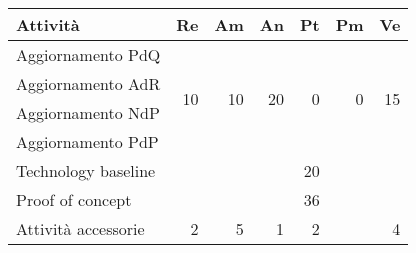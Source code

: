 \begin{table}[H]
	\centering
	\begin{tabular}{|l|r|r|r|r|r|r|}
		\hline
		\rowcolor{lighter-grayer}
		\textbf{Attività}                                                           & \multicolumn{1}{l|}{\textbf{Re}} & \multicolumn{1}{l|}{\textbf{Am}} & \multicolumn{1}{l|}{\textbf{An}} & \multicolumn{1}{l|}{\textbf{Pt}} & \multicolumn{1}{l|}{\textbf{Pm}} & \multicolumn{1}{l|}{\textbf{Ve}} \\ \hline
		Aggiornamento PdQ                                                           & \multirow{4}{*}{10}              & \multirow{4}{*}{10}              & \multirow{4}{*}{20}              & \multirow{4}{*}{0}               & \multirow{4}{*}{0}               & \multirow{4}{*}{15}              \\ \cline{1-1}
		Aggiornamento AdR                                                           &                                  &                                  &                                  &                                  &                                  &                                  \\ \cline{1-1}
		Aggiornamento NdP                                                           &                                  &                                  &                                  &                                  &                                  &                                  \\ \cline{1-1}
		Aggiornamento PdP                                                           &                                  &                                  &                                  &                                  &                                  &                                  \\ \hline
		Technology baseline                                                         &                                  &                                  &                                  & 20                               &                                  &                                  \\ \hline
		Proof of concept                                                            &                                 &                                 &                                 & 36                               &                                 &                                 \\ \hline
		Attività accessorie & 2                                & 5                                & 1                                & 2                                &                                  & 4                                \\ \hline

\end{tabular}
\end{table}
